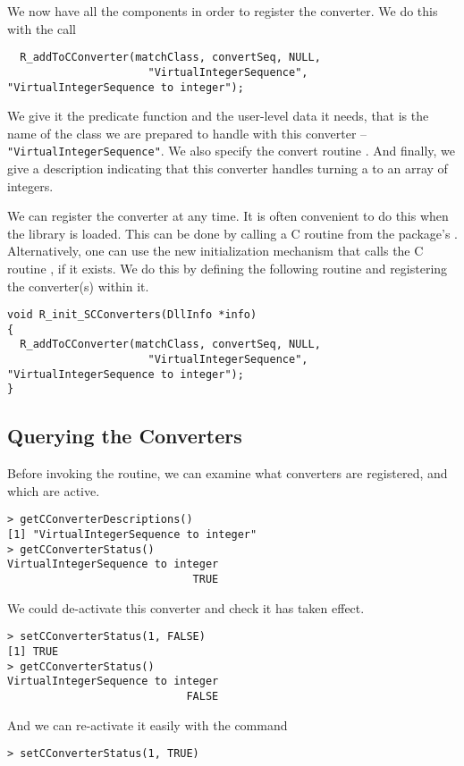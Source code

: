\documentclass{article}
\begin{document}
We now have all the components in order to register
the converter.
We do this with the call
\begin{verbatim}
  R_addToCConverter(matchClass, convertSeq, NULL, 
                      "VirtualIntegerSequence", "VirtualIntegerSequence to integer");
\end{verbatim}
We give it the predicate function and the user-level data it needs,
that is the name of the class we are prepared to handle with this
converter -- \texttt{"VirtualIntegerSequence"}.  We also specify the
convert routine .  And finally, we give a
description indicating that this converter handles turning a
 to an array of integers.

We can register the converter at any time.  It is often convenient to
do this when the library is loaded. This can be done by calling a C
routine from the package's .  Alternatively, one
can use the new initialization mechanism that calls the C routine
, if it exists.
We do this by defining the following routine
and registering the converter(s) within it.
\begin{verbatim}
void R_init_SCConverters(DllInfo *info)
{
  R_addToCConverter(matchClass, convertSeq, NULL, 
                      "VirtualIntegerSequence", "VirtualIntegerSequence to integer");
}
\end{verbatim}



\subsection{Querying the Converters}
Before invoking the  routine,
we can examine what converters are registered, and
which are active.
\begin{verbatim}
> getCConverterDescriptions()
[1] "VirtualIntegerSequence to integer" 
> getCConverterStatus()
VirtualIntegerSequence to integer 
                             TRUE
\end{verbatim}

We could de-activate this converter
and check it has taken effect.
\begin{verbatim}
> setCConverterStatus(1, FALSE)
[1] TRUE
> getCConverterStatus()
VirtualIntegerSequence to integer
                            FALSE 
\end{verbatim}
And we can re-activate it
easily with the command
\begin{verbatim}
> setCConverterStatus(1, TRUE)
\end{verbatim}
\end{document}
